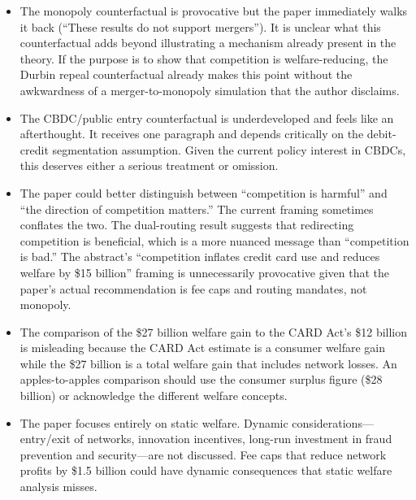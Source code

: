 \documentclass[11pt]{article}
\begin{document}
\begin{itemize}[leftmargin=*]
    \item The monopoly counterfactual is provocative but the paper immediately walks it back (``These results do not support mergers''). It is unclear what this counterfactual adds beyond illustrating a mechanism already present in the theory. If the purpose is to show that competition is welfare-reducing, the Durbin repeal counterfactual already makes this point without the awkwardness of a merger-to-monopoly simulation that the author disclaims.

    \item The CBDC/public entry counterfactual is underdeveloped and feels like an afterthought. It receives one paragraph and depends critically on the debit-credit segmentation assumption. Given the current policy interest in CBDCs, this deserves either a serious treatment or omission.

    \item The paper could better distinguish between ``competition is harmful'' and ``the direction of competition matters.'' The current framing sometimes conflates the two. The dual-routing result suggests that redirecting competition is beneficial, which is a more nuanced message than ``competition is bad.'' The abstract's ``competition inflates credit card use and reduces welfare by \$15 billion'' framing is unnecessarily provocative given that the paper's actual recommendation is fee caps and routing mandates, not monopoly.

    \item The comparison of the \$27 billion welfare gain to the CARD Act's \$12 billion is misleading because the CARD Act estimate is a consumer welfare gain while the \$27 billion is a total welfare gain that includes network losses. An apples-to-apples comparison should use the consumer surplus figure (\$28 billion) or acknowledge the different welfare concepts.

    \item The paper focuses entirely on static welfare. Dynamic considerations---entry/exit of networks, innovation incentives, long-run investment in fraud prevention and security---are not discussed. Fee caps that reduce network profits by \$1.5 billion could have dynamic consequences that static welfare analysis misses.
\end{itemize}
\end{document}
